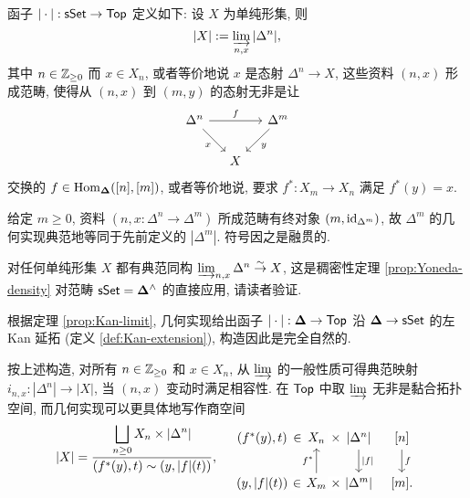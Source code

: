 \begin{definition}[几何实现函子]
	函子 $|\cdot|: \mathsf{sSet} \to \mathsf{Top}$ 定义如下: 设 $X$ 为单纯形集, 则
	\[ |X| := \varinjlim_{n, x} |\Delta^n|, \]
	其中 $n \in \mathbb{Z}_{\geq 0}$ 而 $x \in X_n$, 或者等价地说 $x$ 是态射 $\Delta^n \to X$, 这些资料 $(n, x)$ 形成范畴, 使得从 $(n, x)$ 到 $(m, y)$ 的态射无非是让
	\[\begin{tikzcd}[column sep=small]
		\Delta^n \arrow[rr, "f"] \arrow[rd, "x"'] & & \Delta^m \arrow[ld, "y"] \\
		& X &
	\end{tikzcd}\]
	交换的 $f \in \operatorname{Hom}_{\bm\Delta}([n], [m])$, 或者等价地说, 要求 $f^*: X_m \to X_n$ 满足 $f^*(y) = x$.
\end{definition}

给定 $m \geq 0$, 资料 $(n, x: \Delta^n \to \Delta^m)$ 所成范畴有终对象 $(m, \mathrm{id}_{\Delta^m})$, 故 $\Delta^m$ 的几何实现典范地等同于先前定义的 $|\Delta^m|$. 符号因之是融贯的.

\begin{remark}\label{rem:simplicial-density}
	对任何单纯形集 $X$ 都有典范同构 $\varinjlim_{n, x} \Delta^n \stackrel{\sim}{\rightarrow} X$, 这是稠密性定理 \ref{prop:Yoneda-density} 对范畴 $\mathsf{sSet} = \bm\Delta^{\wedge}$ 的直接应用, 请读者验证.
\end{remark}

\begin{remark}
	根据定理 \ref{prop:Kan-limit}, 几何实现给出函子 $|\cdot|: \bm\Delta \to \mathsf{Top}$ 沿 $\bm\Delta \to \mathsf{sSet}$ 的左 Kan 延拓 (定义 \ref{def:Kan-extension}), 构造因此是完全自然的.
\end{remark}

按上述构造, 对所有 $n \in \mathbb{Z}_{\geq 0}$ 和 $x \in X_n$, 从 $\varinjlim$ 的一般性质可得典范映射 $i_{n, x}: |\Delta^n| \to |X|$, 当 $(n, x)$ 变动时满足相容性. 在 $\mathsf{Top}$ 中取 $\varinjlim$ 无非是黏合拓扑空间, 而几何实现可以更具体地写作商空间
\begin{equation}\label{eqn:geom-realization-quotient}
	|X| = \dfrac{\displaystyle\bigsqcup_{n \geq 0} X_n \times |\Delta^n| }{(f^*(y), t) \sim (y, |f|(t)) }, \quad
	\begin{tikzcd}[column sep=tiny]
		(f^*(y), t) \arrow[phantom, r, "\in" description] & X_n \arrow[phantom, r, "\times" description] & {|\Delta^n|} \arrow[d, "{|f|}"] & {[n]} \arrow[d, "f"] \\
		(y, {|f|}(t)) \arrow[phantom, r, "\in" description] & X_m \arrow[phantom, r, "\times" description] \arrow[u, "{f^*}"] & {|\Delta^m|} & {[m]}.
	\end{tikzcd}
\end{equation}

